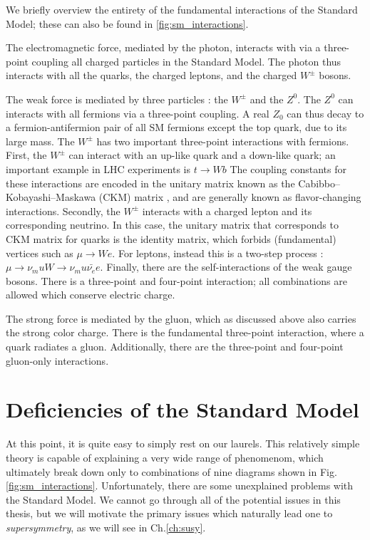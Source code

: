 We briefly overview the entirety of the fundamental interactions of the Standard Model; these can also be found in \ref{fig:sm_interactions}.

The electromagnetic force, mediated by the photon, interacts with via a three-point coupling all charged particles in the Standard Model.
The photon thus interacts with all the quarks, the charged leptons, and the charged $W^\pm$ bosons.

The weak force is mediated by three particles : the $W^\pm$ and the $Z^0$.
The $Z^0$ can interacts with all fermions via a three-point coupling.
A real $Z_0$ can thus decay to a fermion-antifermion pair of all SM fermions except the top quark, due to its large mass.
The $W^\pm$ has two important three-point interactions with fermions.
First, the $W^\pm$ can interact with an up-like quark and a down-like quark; an important example in LHC experiments is $t \rightarrow Wb$
The coupling constants for these interactions are encoded in the unitary matrix known as the Cabibbo–Kobayashi–Maskawa (CKM) matrix \cite{Cabibbo:1963yz,Kobayashi:1973fv}, and are generally known as flavor-changing interactions.
Secondly, the $W^\pm$ interacts with a charged lepton and its corresponding neutrino.
In this case, the unitary matrix that corresponds to CKM matrix for quarks is the identity matrix, which forbids (fundamental) vertices such as $\mu \rightarrow We$.
For leptons, instead this is a two-step process : $\mu \rightarrow \nu_mu W \rightarrow \nu_mu \bar{\nu_e} e$.
Finally, there are the self-interactions of the weak gauge bosons.
There is a three-point and four-point interaction; all combinations are allowed which conserve electric charge.

The strong force is mediated by the gluon, which as discussed above also carries the strong color charge.
There is the fundamental three-point interaction, where a quark radiates a gluon.
Additionally, there are the three-point and four-point gluon-only interactions.

\section{Deficiencies of the Standard Model}

At this point, it is quite easy to simply rest on our laurels.
This relatively simple theory is capable of explaining a very wide range of phenomenom, which ultimately break down only to combinations of nine diagrams shown in Fig.\ref{fig:sm_interactions}.
Unfortunately, there are some unexplained problems with the Standard Model.
We cannot go through all of the potential issues in this thesis, but we will motivate the primary issues which naturally lead one to \textit{supersymmetry}, as we will see in Ch.\ref{ch:susy}.

